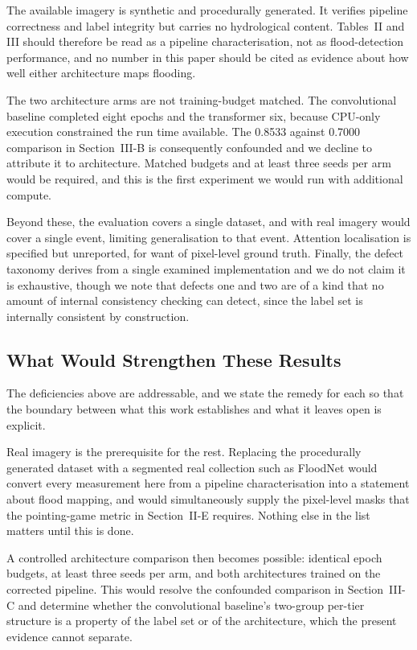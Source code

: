 \documentclass[11pt,journal]{IEEEtran}
\begin{document}
The available imagery is synthetic and procedurally generated. It verifies
pipeline correctness and label integrity but carries no hydrological content.
Tables~II and III should therefore be read as a pipeline characterisation, not
as flood-detection performance, and no number in this paper should be cited as
evidence about how well either architecture maps flooding.

The two architecture arms are not training-budget matched. The convolutional
baseline completed eight epochs and the transformer six, because CPU-only
execution constrained the run time available. The 0.8533 against 0.7000
comparison in Section~III-B is consequently confounded and we decline to
attribute it to architecture. Matched budgets and at least three seeds per arm
would be required, and this is the first experiment we would run with additional
compute.

Beyond these, the evaluation covers a single dataset, and with real imagery
would cover a single event, limiting generalisation to that event. Attention
localisation is specified but unreported, for want of pixel-level ground truth.
Finally, the defect taxonomy derives from a single examined implementation and
we do not claim it is exhaustive, though we note that defects one and two are
of a kind that no amount of internal consistency checking can detect, since the
label set is internally consistent by construction.

\subsection{What Would Strengthen These Results}

The deficiencies above are addressable, and we state the remedy for each so
that the boundary between what this work establishes and what it leaves open is
explicit.

Real imagery is the prerequisite for the rest. Replacing the procedurally
generated dataset with a segmented real collection such as FloodNet would
convert every measurement here from a pipeline characterisation into a
statement about flood mapping, and would simultaneously supply the pixel-level
masks that the pointing-game metric in Section~II-E requires. Nothing else in
the list matters until this is done.

A controlled architecture comparison then becomes possible: identical epoch
budgets, at least three seeds per arm, and both architectures trained on the
corrected pipeline. This would resolve the confounded comparison in
Section~III-C and determine whether the convolutional baseline's two-group
per-tier structure is a property of the label set or of the architecture, which
the present evidence cannot separate.
\end{document}
